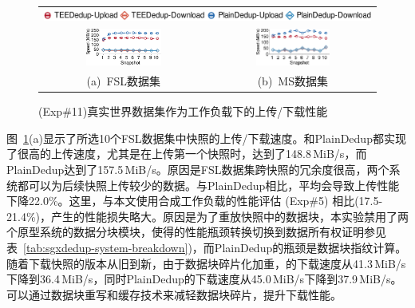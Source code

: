 \begin{figure}[!htb]
    \centering
    \begin{tabular}{@{\ }c@{\ }c}
        \multicolumn{2}{c}{\includegraphics[width=\textwidth]{pic/sgxdedup/expb2_trace_legend.pdf}} \\
        \hspace{-0.1in}
        \includegraphics[width=0.47\textwidth]{pic/sgxdedup/expb2_trace_fsl_plain_sgx.pdf} & 
        \includegraphics[width=0.47\textwidth]{pic/sgxdedup/expb2_trace_ms_plain_sgx.pdf}           \\
        \mbox{\small (a) FSL数据集}                                                        & 
        \mbox{\small (b) MS数据集}
    \end{tabular}
    \caption{(Exp\#11)真实世界数据集作为工作负载下的上传/下载性能}
    \label{fig:sgxdedup-tracePerformance}
\end{figure}

图~\ref{fig:sgxdedup-tracePerformance}(a)显示了所选10个FSL数据集中快照的上传/下载速度。\sysnameS 和PlainDedup都实现了很高的上传速度，尤其是在上传第一个快照时，\sysnameS 达到了148.8\,MiB/s，而PlainDedup达到了157.5\,MiB/s。原因是FSL数据集跨快照的冗余度很高，两个系统都可以为后续快照上传较少的数据。与PlainDedup相比，\sysnameS 平均会导致上传性能下降22.0\%。这里，与本文使用合成工作负载的性能评估 (Exp\#5) 相比(17.5-21.4\%)，产生的性能损失略大。原因是为了重放快照中的数据块，本实验禁用了两个原型系统的数据分块模块，使得\sysnameS 的性能瓶颈转换切换到数据所有权证明参见表~\ref{tab:sgxdedup-system-breakdown})，而PlainDedup的瓶颈是数据块指纹计算。随着下载快照的版本从旧到新，由于数据块碎片化\cite{lillibridge13}加重，\sysnameS 的下载速度从41.3\,MiB/s下降到36.4\,MiB/s，同时PlainDedup的下载速度从45.0\,MiB/s下降到37.9\,MiB/s。\sysnameS 可以通过数据块重写和缓存\cite{lillibridge13,cao2018ALACC}技术来减轻数据块碎片，提升下载性能。

